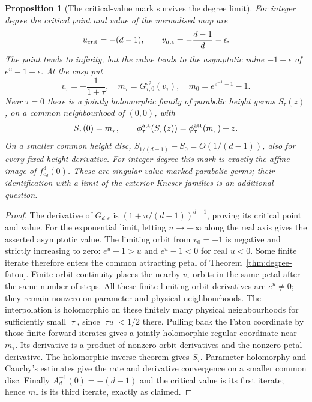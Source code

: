 \documentclass[11pt]{article}
\newtheorem{proposition}[theorem]{Proposition}
\begin{document}
\begin{proposition}[The critical-value mark survives the degree limit]
\label{prop:degree-mark}
For integer degree the critical point and value of the normalised map
are
\[
 u_{\rm crit}=-(d-1),\qquad
 v_{d,\epsilon}=-\frac{d-1}{d}-\epsilon.
\]
The point tends to infinity, but the value tends to the asymptotic
value $-1-\epsilon$ of $e^u-1-\epsilon$.
At the cusp put
\[
 v_\tau=-\frac1{1+\tau},\quad
 m_\tau=G_{\tau,0}^{\circ2}(v_\tau),\quad
 m_0=e^{e^{-1}-1}-1.
\]
Near $\tau=0$ there is a jointly holomorphic family of parabolic
height germs $S_\tau(z)$, on a common neighbourhood of $(0,0)$, with
\[
 S_\tau(0)=m_\tau,\qquad
 \phi^{\rm att}_\tau(S_\tau(z))
   =\phi^{\rm att}_\tau(m_\tau)+z.
\]
On a smaller common height disc,
$S_{1/(d-1)}-S_0=O(1/(d-1))$, also for every fixed height derivative.
For integer degree this mark is exactly the affine image of
$f_{c_d}^3(0)$. These are singular-value marked parabolic germs;
their identification with a limit of the exterior Kneser families
is an additional question.
\end{proposition}
\begin{proof}
The derivative of $G_{d,\epsilon}$ is
$(1+u/(d-1))^{d-1}$, proving its critical point and value.
For the exponential limit, letting $u\to-\infty$ along the real
axis gives the asserted asymptotic value.
The limiting orbit from $v_0=-1$ is negative and strictly increasing
to zero: $e^u-1>u$ and $e^u-1<0$ for real $u<0$.
Some finite iterate therefore enters the common attracting petal
of Theorem~\ref{thm:degree-fatou}. Finite orbit continuity places
the nearby $v_\tau$ orbits in the same petal after the same number
of steps. All these finite limiting orbit derivatives are $e^u\ne0$;
they remain nonzero on parameter and physical neighbourhoods.
The interpolation is holomorphic on these finitely many physical
neighbourhoods for sufficiently small $|\tau|$, since
$|\tau u|<1/2$ there.
Pulling back the Fatou coordinate by those finite forward iterates
gives a jointly holomorphic regular coordinate near $m_\tau$.
Its derivative is a product of nonzero orbit derivatives and the
nonzero petal derivative. The holomorphic inverse theorem gives
$S_\tau$. Parameter holomorphy and Cauchy's estimates give the rate
and derivative convergence on a smaller common disc.
Finally $A_d^{-1}(0)=-(d-1)$ and the critical value is its first
iterate; hence $m_\tau$ is its third iterate, exactly as claimed.
\end{proof}
\end{document}
